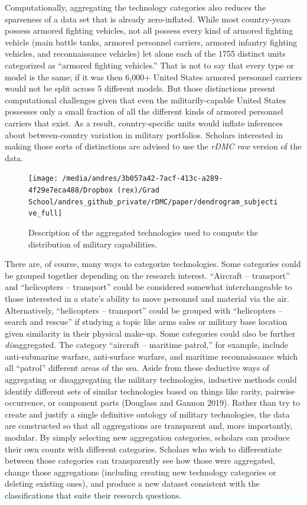 \documentclass[
]{article}
\begin{document}
Computationally, aggregating the technology categories also reduces the sparseness of a data set that is already zero-inflated. While most country-years possess armored fighting vehicles, not all possess every kind of armored fighting vehicle (main battle tanks, armored personnel carriers, armored infantry fighting vehicles, and reconnaissance vehicles) let alone each of the 1755 distinct units categorized as ``armored fighting vehicles.'' That is not to say that every type or model is the same; if it was then 6,000+ United States armored personnel carriers would not be split across 5 different models. But those distinctions present computational challenges given that even the militarily-capable United States possesses only a small fraction of all the different kinds of armored personnel carriers that exist. As a result, country-specific units would inflate inferences about between-country variation in military portfolios. Scholars interested in making those sorts of distinctions are advised to use the \textit{rDMC raw} version of the data.

\begin{figure}[H]

{\centering \texttt{[image: /media/andres/3b057a42-7acf-413c-a289-4f29e7eca488/Dropbox (rex)/Grad School/andres\_github\_private/rDMC/paper/dendrogram\_subjective\_full]} 

}

\caption{Description of the aggregated technologies used to compute the distribution of military capabilities.}\label{fig:dendrogram}
\end{figure}

There are, of course, many ways to categorize technologies. Some categories could be grouped together depending on the research interest. ``Aircraft -- transport'' and ``helicopters -- transport'' could be considered somewhat interchangeable to those interested in a state's ability to move personnel and material via the air. Alternatively, ``helicopters -- transport'' could be grouped with ``helicopters -- search and rescue'' if studying a topic like arms sales or military base location given similarity in their physical make-up. Some categories could also be further \emph{dis}aggregated. The category ``aircraft -- maritime patrol,'' for example, include anti-submarine warfare, anti-surface warfare, and maritime reconnaissance which all ``patrol'' different areas of the sea. Aside from these deductive ways of aggregating or disaggregating the military technologies, inductive methods could identify different sets of similar technologies based on things like rarity, pairwise occurrence, or component parts (Douglass and Gannon 2019). Rather than try to create and justify a single definitive ontology of military technologies, the data are constructed so that all aggregations are transparent and, more importantly, modular. By simply selecting new aggregation categories, scholars can produce their own counts with different categories. Scholars who wish to differentiate between those categories can transparently see how those were aggregated, change those aggregations (including creating new technology categories or deleting existing ones), and produce a new dataset consistent with the classifications that suite their research questions.
\end{document}
